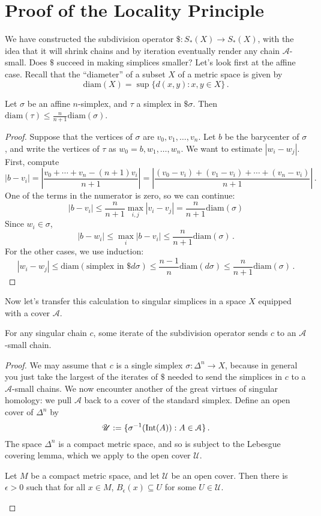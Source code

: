 \section{Proof of the Locality Principle}

We have constructed the subdivision operator $\$:S_*(X)\to S_*(X)$, with the
idea that it will shrink chains and by iteration eventually render any chain 
$\mathscr{A}$-small. Does $\$$ succeed in making simplices smaller? Let's 
look first at the affine case. Recall that the ``diameter'' of a subset $X$ of 
a metric space is given by
\[
\mathrm{diam}(X)=\sup\{d(x,y):x,y\in X\}\,.
\]

\begin{lemma}
Let $\sigma$ be an affine $n$-simplex, and $\tau$ a simplex in $\$\sigma$.
Then $\mathrm{diam}(\tau)\leq \frac{n}{n+1}\mathrm{diam}(\sigma)$.
\end{lemma}
\begin{proof}
Suppose that the vertices of $\sigma$ are $v_0,v_1,\ldots,v_n$. Let $b$ be the 
barycenter of $\sigma$, and write the vertices of $\tau$ as $w_0=b,w_1,\ldots,w_n$. We want to estimate $|w_i-w_j|$. First, compute
\[
|b-v_i|  =\left|\frac{v_0+\cdots+v_n-(n+1)v_i}{n+1}\right|
=\left|\frac{(v_0-v_i)+(v_1-v_i)+\cdots+(v_n-v_i)}{n+1}\right|\,.
\]
One of the terms in the numerator is zero, so we can continue: 
\[
|b-v_i| \leq \frac{n}{n+1}\max_{i,j}|v_i-v_j| 
= \frac{n}{n+1}\mathrm{diam}(\sigma)
\]
Since $w_i\in\sigma$, 
\[
|b-w_i| \leq\max_i|b-v_i| \leq \frac{n}{n+1}\mathrm{diam}(\sigma)\,.
\]
For the other cases, we use induction:
\[
|w_i-w_j| \leq \mathrm{diam}(\text{simplex in }\$d\sigma)
\leq \frac{n-1}{n}\mathrm{diam}(d\sigma)
\leq \frac{n}{n+1}\mathrm{diam}(\sigma)\,.
\]
\end{proof}

Now let's transfer this calculation to singular simplices in a space $X$ 
equipped with a cover $\mathscr{A}$. 
\begin{lemma}
For any singular chain $c$, some iterate of the subdivision operator sends $c$ to an $\mathscr{A}$-small chain.
\end{lemma}
\begin{proof} We may assume that $c$ is a single simplex $\sigma:\Delta^n\to X$, because in general you just take the largest of the iterates of $\$$ needed to send the simplices in $c$ to a $\mathscr{A}$-small chains.
We now encounter another of the great virtues of singular homology:
we pull $\mathscr{A}$ back to a cover of the standard simplex. 
Define an open cover of $\Delta^n$ by 
\[
\mathscr{U}:=\{\sigma^{-1}(\mathrm{Int}(A)):A\in\mathcal{A}\}\,.
\]
The space $\Delta^n$ is a compact metric space, and so is subject to the
Lebesgue covering lemma, which we apply to the open cover $\mathscr{U}$.
\begin{lemma}
Let $M$ be a compact metric space, and let $\mathscr{U}$ be an open cover. Then there is $\epsilon> 0$ such that for all $x\in M$, 
$B_\epsilon(x)\subseteq U$ for some $U\in \mathscr{U}$.
\end{lemma}
\end{proof}

